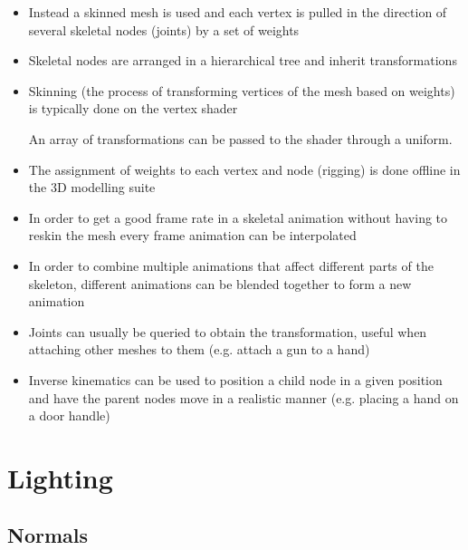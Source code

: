 \documentclass[a4paper]{article}
\begin{document}
\begin{itemize}
  \item
    Instead a skinned mesh is used and each vertex is pulled in the direction of
    several skeletal nodes (joints) by a set of weights

  \item
    Skeletal nodes are arranged in a hierarchical tree and inherit
    transformations

  \item
    Skinning (the process of transforming vertices of the mesh based on weights)
    is typically done on the vertex shader

    An array of transformations can be passed to the shader through a uniform.

  \item
    The assignment of weights to each vertex and node (rigging) is done offline
    in the 3D modelling suite

  \item
    In order to get a good frame rate in a skeletal animation without having to
    reskin the mesh every frame animation can be interpolated

  \item
    In order to combine multiple animations that affect different parts of the
    skeleton, different animations can be blended together to form a new
    animation

  \item
    Joints can usually be queried to obtain the transformation, useful when
    attaching other meshes to them (e.g. attach a gun to a hand)

  \item
    Inverse kinematics can be used to position a child node in a given position
    and have the parent nodes move in a realistic manner (e.g. placing a hand on
    a door handle)

\end{itemize}

\section{Lighting}

\subsection{Normals}
\end{document}
